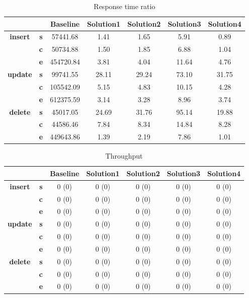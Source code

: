 \begin{table}[h]
\centering
\caption{Response time ratio}\label{t:}
\begin{tabular}{ccccccc}
\toprule
&&\textbf{Baseline} & \textbf{Solution1} & \textbf{Solution2} & \textbf{Solution3} & \textbf{Solution4}\\
\midrule
\multirow{3}{*}{\textbf{insert}} & \textbf{s} & 57441.68 & 1.41 & 1.65 & 5.91 & 0.89\\
 & \textbf{c} & 50734.88 & 1.50 & 1.85 & 6.88 & 1.04\\
 & \textbf{e} & 454720.84 & 3.81 & 4.04 & 11.64 & 4.76\\
\midrule
\multirow{3}{*}{\textbf{update}} & \textbf{s} & 99741.55 & 28.11 & 29.24 & 73.10 & 31.75\\
 & \textbf{c} & 105542.09 & 5.15 & 4.83 & 10.15 & 4.28\\
 & \textbf{e} & 612375.59 & 3.14 & 3.28 & 8.96 & 3.74\\
\midrule
\multirow{3}{*}{\textbf{delete}} & \textbf{s} & 45017.05 & 24.69 & 31.76 & 95.14 & 19.88\\
 & \textbf{c} & 44586.46 & 7.84 & 8.34 & 14.84 & 8.28\\
 & \textbf{e} & 449643.86 & 1.39 & 2.19 & 7.86 & 1.01\\
\bottomrule
\end{tabular}
\end{table}






\begin{table}[h]
\centering
\caption{Throughput}\label{t:}
\begin{tabular}{ccccccc}
\toprule
&&\textbf{Baseline} & \textbf{Solution1} & \textbf{Solution2} & \textbf{Solution3} & \textbf{Solution4}\\
\midrule
\multirow{3}{*}{\textbf{insert}} & \textbf{s} & 0 (0) & 0 (0) & 0 (0) & 0 (0) & 0 (0)\\
 & \textbf{c} & 0 (0) & 0 (0) & 0 (0) & 0 (0) & 0 (0)\\
 & \textbf{e} & 0 (0) & 0 (0) & 0 (0) & 0 (0) & 0 (0)\\
\midrule
\multirow{3}{*}{\textbf{update}} & \textbf{s} & 0 (0) & 0 (0) & 0 (0) & 0 (0) & 0 (0)\\
 & \textbf{c} & 0 (0) & 0 (0) & 0 (0) & 0 (0) & 0 (0)\\
 & \textbf{e} & 0 (0) & 0 (0) & 0 (0) & 0 (0) & 0 (0)\\
\midrule
\multirow{3}{*}{\textbf{delete}} & \textbf{s} & 0 (0) & 0 (0) & 0 (0) & 0 (0) & 0 (0)\\
 & \textbf{c} & 0 (0) & 0 (0) & 0 (0) & 0 (0) & 0 (0)\\
 & \textbf{e} & 0 (0) & 0 (0) & 0 (0) & 0 (0) & 0 (0)\\
\bottomrule
\end{tabular}
\end{table}



